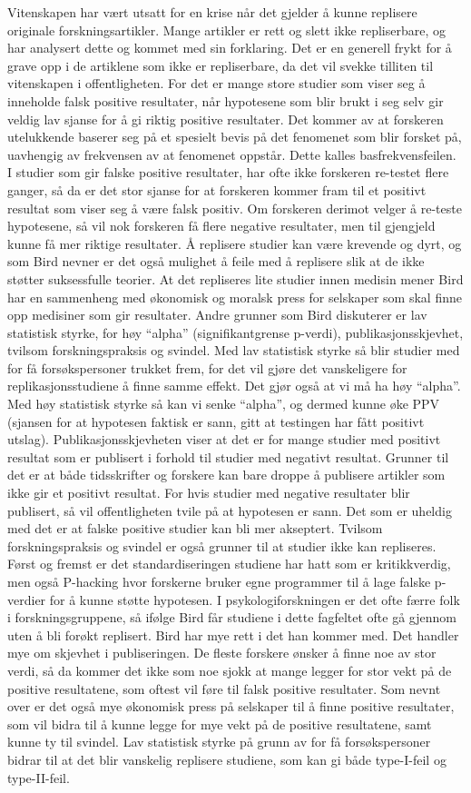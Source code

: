 \documentclass[
]{book}
\begin{document}
Vitenskapen har vært utsatt for en krise når det gjelder å kunne replisere originale forskningsartikler. Mange artikler er rett og slett ikke repliserbare, og \citet{bird2020} har analysert dette og kommet med sin forklaring. Det er en generell frykt for å grave opp i de artiklene som ikke er repliserbare, da det vil svekke tilliten til vitenskapen i offentligheten. For det er mange store studier som viser seg å inneholde falsk positive resultater, når hypotesene som blir brukt i seg selv gir veldig lav sjanse for å gi riktig positive resultater. Det kommer av at forskeren utelukkende baserer seg på et spesielt bevis på det fenomenet som blir forsket på, uavhengig av frekvensen av at fenomenet oppstår. Dette kalles basfrekvensfeilen. I studier som gir falske positive resultater, har ofte ikke forskeren re-testet flere ganger, så da er det stor sjanse for at forskeren kommer fram til et positivt resultat som viser seg å være falsk positiv. Om forskeren derimot velger å re-teste hypotesene, så vil nok forskeren få flere negative resultater, men til gjengjeld kunne få mer riktige resultater. Å replisere studier kan være krevende og dyrt, og som Bird nevner er det også mulighet å feile med å replisere slik at de ikke støtter suksessfulle teorier. At det repliseres lite studier innen medisin mener Bird har en sammenheng med økonomisk og moralsk press for selskaper som skal finne opp medisiner som gir resultater. Andre grunner som Bird diskuterer er lav statistisk styrke, for høy ``alpha'' (signifikantgrense p-verdi), publikasjonsskjevhet, tvilsom forskningspraksis og svindel. Med lav statistisk styrke så blir studier med for få forsøkspersoner trukket frem, for det vil gjøre det vanskeligere for replikasjonsstudiene å finne samme effekt. Det gjør også at vi må ha høy ``alpha''. Med høy statistisk styrke så kan vi senke ``alpha'', og dermed kunne øke PPV (sjansen for at hypotesen faktisk er sann, gitt at testingen har fått positivt utslag). Publikasjonsskjevheten viser at det er for mange studier med positivt resultat som er publisert i forhold til studier med negativt resultat. Grunner til det er at både tidsskrifter og forskere kan bare droppe å publisere artikler som ikke gir et positivt resultat. For hvis studier med negative resultater blir publisert, så vil offentligheten tvile på at hypotesen er sann. Det som er uheldig med det er at falske positive studier kan bli mer akseptert. Tvilsom forskningspraksis og svindel er også grunner til at studier ikke kan repliseres. Først og fremst er det standardiseringen studiene har hatt som er kritikkverdig, men også P-hacking hvor forskerne bruker egne programmer til å lage falske p-verdier for å kunne støtte hypotesen. I psykologiforskningen er det ofte færre folk i forskningsgruppene, så ifølge Bird får studiene i dette fagfeltet ofte gå gjennom uten å bli forøkt replisert. Bird har mye rett i det han kommer med. Det handler mye om skjevhet i publiseringen. De fleste forskere ønsker å finne noe av stor verdi, så da kommer det ikke som noe sjokk at mange legger for stor vekt på de positive resultatene, som oftest vil føre til falsk positive resultater. Som nevnt over er det også mye økonomisk press på selskaper til å finne positive resultater, som vil bidra til å kunne legge for mye vekt på de positive resultatene, samt kunne ty til svindel. Lav statistisk styrke på grunn av for få forsøkspersoner bidrar til at det blir vanskelig replisere studiene, som kan gi både type-I-feil og type-II-feil.

  
\end{document}
